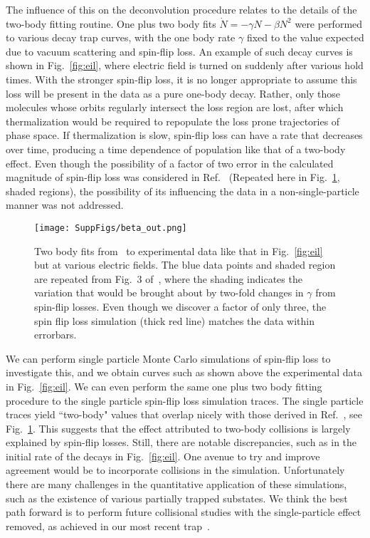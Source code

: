 \documentclass[%
 reprint,
 amsmath,amssymb,
 aps,
prl,
]{revtex4-1}
\begin{document}
The influence of this on the deconvolution procedure relates to the details of the two-body fitting routine.
One plus two body fits $\dot{N}=-\gamma N-\beta N^2$ were performed to various decay trap curves, with the one body rate $\gamma$ fixed to the value expected due to vacuum scattering and spin-flip loss.
An example of such decay curves is shown in Fig.~\ref{fig:eil}, where electric field is turned on suddenly after various hold times.
With the stronger spin-flip loss, it is no longer appropriate to assume this loss will be present in the data as a pure one-body decay.
Rather, only those molecules whose orbits regularly intersect the loss region are lost, after which thermalization would be required to repopulate the loss prone trajectories of phase space.
If thermalization is slow, spin-flip loss can have a rate that decreases over time, producing a time dependence of population like that of a two-body effect.
Even though the possibility of a factor of two error in the calculated magnitude of spin-flip loss was considered in Ref.~\cite{Stuhl2013} (Repeated here in Fig.~\ref{fig:beta}, shaded regions), the possibility of its influencing the data in a non-single-particle manner was not addressed.

\begin{figure}[t] 
\texttt{[image: SuppFigs/beta\_out.png]} 
\caption{Two body fits from~\cite{Stuhl2013} to experimental data like that in Fig.~\ref{fig:eil} but at various electric fields. The blue data points and shaded region are repeated from Fig.~3 of~\cite{Stuhl2013}, where the shading indicates the variation that would be brought about by two-fold changes in $\gamma$ from spin-flip losses. Even though we discover a factor of only three, the spin flip loss simulation (thick red line) matches the data within errorbars.\label{fig:beta}}
\end{figure}


We can perform single particle Monte Carlo simulations of spin-flip loss to investigate this, and we obtain curves such as shown above the experimental data in Fig.~\ref{fig:eil}.
We can even perform the same one plus two body fitting procedure to the single particle spin-flip loss simulation traces.
The single particle traces yield ``two-body" values that overlap nicely with those derived in Ref.~\cite{Stuhl2013}, see Fig.~\ref{fig:beta}.
This suggests that the effect attributed to two-body collisions is largely explained by spin-flip losses.
Still, there are notable discrepancies, such as in the initial rate of the decays in Fig.~\ref{fig:eil}.
One avenue to try and improve agreement would be to incorporate collisions in the simulation.
Unfortunately there are many challenges in the quantitative application of these simulations, such as the existence of various partially trapped substates.
We think the best path forward is to perform future collisional studies with the single-particle effect removed, as achieved in our most recent trap~\cite{smt}.
\end{document}

